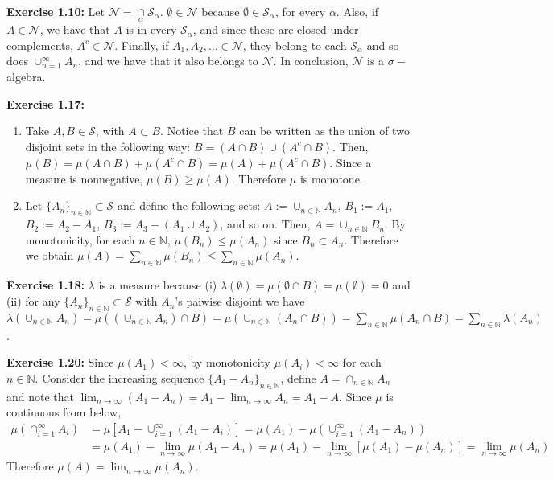 \documentclass[11.5pt, letterpaper, bibtotoc,
    tablecaptionabove, figurecaptionabove]{article}
\begin{document}
\textbf{Exercise 1.10:}
Let $\mathcal N = \underset{\alpha}{\cap}\mathcal S_\alpha$.
$\emptyset\in\mathcal N$ because $\emptyset\in\mathcal S_\alpha$, for every $\alpha$.
Also, if $A\in\mathcal N$, we have that $A$ is in every $\mathcal S_\alpha$,
and since these are closed under complements, $A^c\in\mathcal N$.
Finally, if $A_1, A_2,\ldots\in\mathcal N$, they belong to each $\mathcal S_\alpha$ and so does 
$\cup_{n=1}^\infty A_n$, and we have that it also belongs to $\mathcal N$.
In conclusion, $\mathcal N$ is a $\sigma-$algebra.

\textbf{Exercise 1.17:}
\begin{enumerate}
\item
Take $A,B\in\mathcal S$, with $A\subset B$.
Notice that $B$ can be written as the union of two disjoint sets in the following way: 
$B = (A\cap B) \cup (A^c\cap B)$.
Then, $\mu(B)=\mu(A\cap B) + \mu(A^c\cap B) = \mu(A) + \mu(A^c\cap B)$.
Since a measure is nonnegative, $\mu(B)\geq\mu(A)$.
Therefore $\mu$ is monotone.

\item
Let $\{A_n\}_{n\in\mathbb N}\subset\mathcal S$ and define the following sets: $A := \cup_{n\in\mathbb N} A_n$,
$B_1 := A_1$, $B_2 := A_2-A_1$, $B_3 := A_3-(A_1\cup A_2)$, and so on.
Then, $A = \cup_{n\in\mathbb N} B_n$.
By monotonicity, for each $n\in\mathbb N$, $\mu(B_n)\leq\mu(A_n)$ since $B_n\subset A_n$.
Therefore we obtain $\mu(A)=\sum_{n\in\mathbb N}\mu(B_n)\leq \sum_{n\in\mathbb N}\mu(A_n)$.
\end{enumerate}

\textbf{Exercise 1.18:}
$\lambda$ is a measure because (i) $\lambda(\emptyset) = \mu(\emptyset\cap B) = \mu(\emptyset) = 0$
and (ii) for any $\{A_n\}_{n\in\mathbb N}\subset\mathcal S$ with $A_n$'s paiwise disjoint we have
$\lambda(\cup_{n\in\mathbb N} A_n) = \mu\left((\cup_{n\in\mathbb N} A_n) \cap B\right) =
\mu\left(\cup_{n\in\mathbb N} (A_n \cap B)\right) = \sum_{n\in\mathbb N}\mu(A_n\cap B) = \sum_{n\in\mathbb N}\lambda(A_n)$.

\textbf{Exercise 1.20:}
Since $\mu(A_1)<\infty$, by monotonicity $\mu(A_i)<\infty$ for each $n\in\mathbb N$.
Consider the increasing sequence $\{A_1-A_n\}_{n\in\mathbb N}$,
define $A=\cap_{n\in\mathbb N} A_n$
and note that $\lim_{n\to\infty}(A_1-A_n) = A_1-\lim_{n\to\infty}A_n = A_1-A$.
Since $\mu$ is continuous from below,
\begin{align*}
\mu (\cap_{i=1}^\infty A_i ) & = \mu[A_1 - \cup_{i=1}^\infty (A_1 - A_i) ] = 
    \mu(A_1) - \mu(\cup_{i=1}^\infty (A_1 - A_n))\\
& = \mu(A_1) - \lim_{n \to \infty} \mu(A_1 - A_n) = 
    \mu(A_1) - \lim_{n \to \infty} [\mu(A_1) - \mu(A_n)]  = \lim_{n \to \infty} \mu(A_n)
\end{align*}
Therefore $\mu(A)=\lim_{n\to\infty}\mu(A_n)$.
\end{document}
